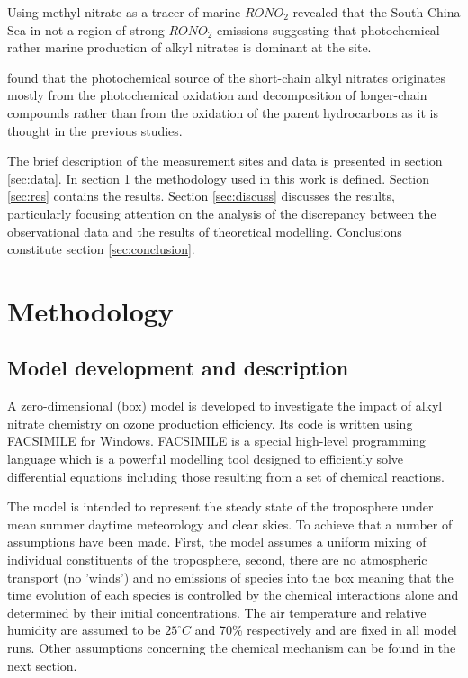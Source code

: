 \documentclass[11pt,a4paper]{article}
\begin{document}
Using methyl nitrate as a tracer of marine $RONO_2$ \cite{Simpson2006} revealed that the South China Sea in not a region of strong $RONO_2$ emissions suggesting that photochemical rather marine production of alkyl nitrates is dominant at the site.

\cite{Worton2010} found that the photochemical source of the short-chain alkyl nitrates originates mostly from the photochemical oxidation and decomposition of longer-chain compounds rather than from the oxidation of the parent hydrocarbons as it is thought in the previous studies.

The brief description of the measurement sites and data is presented in section \ref{sec:data}. In section \ref{sec:method} the methodology used in this work is defined. Section \ref{sec:res} contains the results. Section \ref{sec:discuss} discusses the results, particularly focusing attention on the analysis of the discrepancy between the observational data and the results of theoretical modelling. Conclusions constitute section \ref{sec:conclusion}.

\section{Methodology} \label{sec:method}
\subsection{Model development and description}
A zero-dimensional (box) model is developed to investigate the impact of alkyl nitrate chemistry on ozone production efficiency. Its code is written using FACSIMILE for Windows. FACSIMILE is a special high-level programming language which is a powerful modelling tool designed to efficiently solve differential equations including those resulting from a set of chemical reactions.

The model is intended to represent the steady state of the troposphere under mean summer daytime meteorology and clear skies. To achieve that a number of assumptions have been made. First, the model assumes a uniform mixing of individual constituents of the troposphere, second, there are no atmospheric transport (no 'winds') and no emissions of species into the box meaning that the time evolution of each species is controlled by the chemical interactions alone and determined by their initial concentrations. The air temperature and relative humidity are assumed to be $25^{\circ}C$ and 70\% respectively and are fixed in all model runs. Other assumptions concerning the chemical mechanism can be found in the next section.
\end{document}
